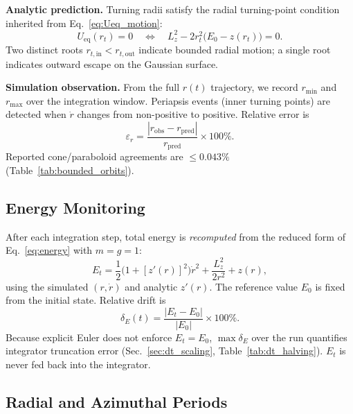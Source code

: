 \documentclass[11pt,letterpaper]{article}
\newcommand{\parhead}[1]{\par\medskip\noindent\textbf{#1}\ignorespaces}
\begin{document}
\parhead{Analytic prediction.}
Turning radii satisfy the radial turning-point condition inherited from Eq.~\eqref{eq:Ueq_motion}:
\begin{equation}\label{eq:turning_analytic}
    U_{\mathrm{eq}}(r_t) = 0
    \quad\Longleftrightarrow\quad
    L_z^2 - 2r_t^2\bigl(E_0 - z(r_t)\bigr) = 0.
\end{equation}
Two distinct roots $r_{t,\mathrm{in}}<r_{t,\mathrm{out}}$ indicate bounded radial motion; a single root indicates outward escape on the Gaussian surface.

\parhead{Simulation observation.}
From the full $r(t)$ trajectory, we record $r_{\min}$ and $r_{\max}$ over the integration window. Periapsis events (inner turning points) are detected when $\dot{r}$ changes from non-positive to positive. Relative error is
\begin{equation}\label{eq:turning_err}
    \varepsilon_r = \frac{|r_{\mathrm{obs}}-r_{\mathrm{pred}}|}{r_{\mathrm{pred}}}\times 100\%.
\end{equation}
Reported cone/paraboloid agreements are $\le 0.043\%$ (Table~\ref{tab:bounded_orbits}).

\subsection{Energy Monitoring}
\label{sec:analysis_energy}

After each integration step, total energy is \emph{recomputed} from the reduced form of Eq.~\eqref{eq:energy} with $m=g=1$:
\begin{equation}\label{eq:Et_num}
    E_t = \frac{1}{2}\bigl(1+[z'(r)]^2\bigr)\dot{r}^2
        + \frac{L_z^2}{2r^2}
        + z(r),
\end{equation}
using the simulated $(r,\dot{r})$ and analytic $z'(r)$. The reference value $E_0$ is fixed from the initial state. Relative drift is
\begin{equation}\label{eq:deltaE_num}
    \delta_E(t) = \frac{|E_t - E_0|}{|E_0|}\times 100\%.
\end{equation}
Because explicit Euler does not enforce $E_t=E_0$, $\max\delta_E$ over the run quantifies integrator truncation error (Sec.~\ref{sec:dt_scaling}, Table~\ref{tab:dt_halving}). $E_t$ is never fed back into the integrator.

\subsection{Radial and Azimuthal Periods}
\label{sec:analysis_periods}
\end{document}
